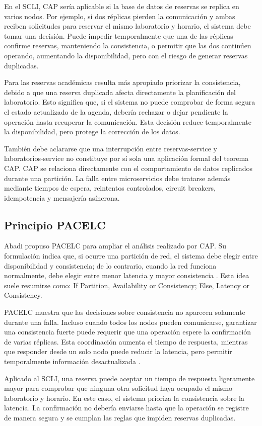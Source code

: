 \documentclass[conference]{IEEEtran}
\begin{document}
En el SCLI, CAP sería aplicable si la base de datos de reservas se replica en varios nodos. Por ejemplo, si dos réplicas pierden la comunicación y ambas reciben solicitudes para reservar el mismo laboratorio y horario, el sistema debe tomar una decisión. Puede impedir temporalmente que una de las réplicas confirme reservas, manteniendo la consistencia, o permitir que las dos continúen operando, aumentando la disponibilidad, pero con el riesgo de generar reservas duplicadas.

Para las reservas académicas resulta más apropiado priorizar la consistencia, debido a que una reserva duplicada afecta directamente la planificación del laboratorio. Esto significa que, si el sistema no puede comprobar de forma segura el estado actualizado de la agenda, debería rechazar o dejar pendiente la operación hasta recuperar la comunicación. Esta decisión reduce temporalmente la disponibilidad, pero protege la corrección de los datos.

También debe aclararse que una interrupción entre reservas-service y laboratorios-service no constituye por sí sola una aplicación formal del teorema CAP. CAP se relaciona directamente con el comportamiento de datos replicados durante una partición. La falla entre microservicios debe tratarse además mediante tiempos de espera, reintentos controlados, circuit breakers, idempotencia y mensajería asíncrona.

\subsection{Principio PACELC}
Abadi propuso PACELC para ampliar el análisis realizado por CAP. Su formulación indica que, si ocurre una partición de red, el sistema debe elegir entre disponibilidad y consistencia; de lo contrario, cuando la red funciona normalmente, debe elegir entre menor latencia y mayor consistencia \cite{ref10}. Esta idea suele resumirse como: If Partition, Availability or Consistency; Else, Latency or Consistency.

PACELC muestra que las decisiones sobre consistencia no aparecen solamente durante una falla. Incluso cuando todos los nodos pueden comunicarse, garantizar una consistencia fuerte puede requerir que una operación espere la confirmación de varias réplicas. Esta coordinación aumenta el tiempo de respuesta, mientras que responder desde un solo nodo puede reducir la latencia, pero permitir temporalmente información desactualizada \cite{ref10}.

Aplicado al SCLI, una reserva puede aceptar un tiempo de respuesta ligeramente mayor para comprobar que ninguna otra solicitud haya ocupado el mismo laboratorio y horario. En este caso, el sistema prioriza la consistencia sobre la latencia. La confirmación no debería enviarse hasta que la operación se registre de manera segura y se cumplan las reglas que impiden reservas duplicadas.
\end{document}
